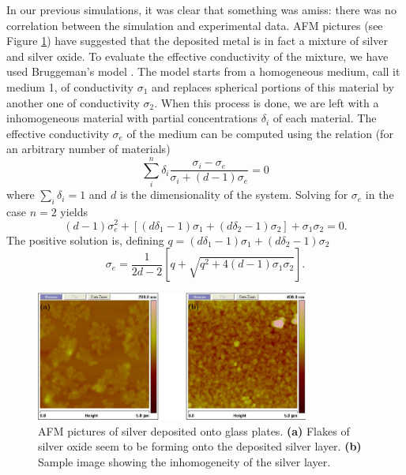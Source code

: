 In our previous simulations, it was clear that something was amiss:
there was no correlation between the simulation and
experimental data. AFM pictures (see Figure \ref{fig:antenna.AFM})  have suggested that the deposited
metal is in fact a mixture of silver and silver oxide. To evaluate
the effective conductivity of the mixture, we have used Bruggeman's model \cite{LAN1978}.
The model starts from a homogeneous medium, call it medium 1, 
of conductivity $\sigma_1$ and replaces spherical portions of this material 
by another one of conductivity $\sigma_2$. When this process is done, 
we are left with a inhomogeneous material with partial concentrations $\delta_i$
of each material. The effective conductivity $\sigma_e$ of the medium can be computed
using the relation (for an arbitrary number of materials)
  \begin{equation}
    \sum_i^n \delta_i \frac{\sigma_i-\sigma_e}{\sigma_i+(d-1)\sigma_e} =0 
  \end{equation}
where $\sum_i\delta_i=1$ and $d$ is the dimensionality of the system.
Solving for $\sigma_e$ in the case $n=2$ yields
  \begin{equation}
   (d-1)\sigma_e^2+\left[\left(d\delta_1-1\right)\sigma_1+\left(d\delta_2-1\right)\sigma_2\right]+\sigma_1\sigma_2=0.
  \end{equation}
The positive solution is, defining $q=\left(d\delta_1-1\right)\sigma_1+\left(d\delta_2-1\right)\sigma_2$
  \begin{equation}
   \label{eq:antenna:bruggeman}
   \sigma_e = \frac{1}{2d-2}\left[q+\sqrt{q^2+4(d-1)\sigma_1\sigma_2}\right].
  \end{equation}
  
\begin{figure}
 \centering
 \includegraphics[width=0.8\textwidth]{figs/active/out/AFM.pdf}
 \caption[AFM pictures of silver deposited onto glass plates]{AFM pictures of silver deposited onto glass plates. \textbf{(a)} Flakes of silver oxide seem to be forming onto the deposited
	  silver layer. \textbf{(b)} Sample image showing the inhomogeneity of the
	  silver layer.}
 \label{fig:antenna.AFM}
\end{figure}


